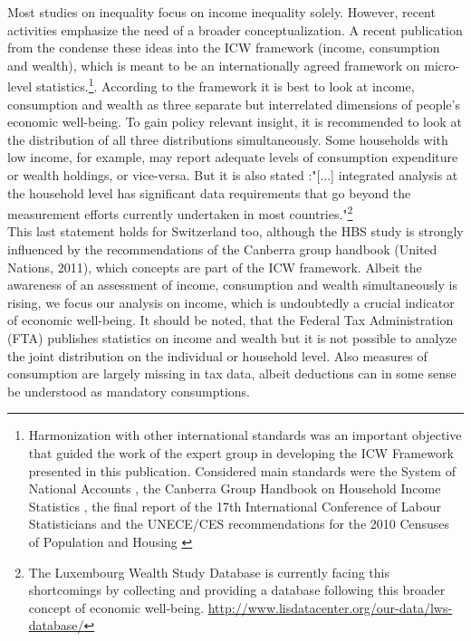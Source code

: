 \documentclass[twoside]{article}\usepackage[]{graphicx}\usepackage[]{color}
\begin{document}
\begin{multicols}{2}
Most studies on inequality focus on income inequality solely. However, recent activities emphasize the need of a broader conceptualization. A recent publication from the \citet{oecd_oecd_2013} condense these ideas into the ICW framework (income, consumption and wealth), which is meant to be an internationally agreed framework on micro-level statistics.\footnote{Harmonization with other international standards was an important objective that guided the work of the expert group in developing the ICW Framework presented in this publication. Considered main standards were the System of National Accounts \citep{sna_system_2008}, the Canberra Group Handbook on Household Income Statistics \citep{united_nations_canberra_2011}, the final report of the 17th International Conference of Labour Statisticians \citep{international_labour_organisation_ilo_final_2004} and the UNECE/CES recommendations for the 2010 Censuses of Population and Housing \citep{unece_conference_2006}}. According to the framework it is best to look at income, consumption and wealth as three separate but interrelated dimensions of people's economic well-being. To gain policy relevant insight, it is recommended to look at the distribution of all three distributions simultaneously. Some households with low income, for example, may report adequate levels of consumption expenditure or wealth holdings, or vice-versa. But it is also stated \citep[18]{oecd_oecd_2013}:"[...] integrated analysis at the household level has significant data requirements that go beyond the measurement efforts currently undertaken in most countries."\footnote{The Luxembourg Wealth Study Database is currently facing this shortcomings by collecting and providing a database following this broader concept of economic well-being. \url{http://www.lisdatacenter.org/our-data/lws-database/}} \\

This last statement holds for Switzerland too, although the HBS study is strongly influenced by the recommendations of the Canberra group handbook (United Nations, 2011), which concepts are part of the ICW framework. Albeit the awareness of an assessment of income, consumption and wealth simultaneously is rising, we focus our analysis on income, which is undoubtedly a crucial indicator of economic well-being. It should be noted, that the Federal Tax Administration (FTA) publishes statistics on income and wealth but it is not possible to analyze the joint distribution on the individual or household level. Also measures of consumption are largely missing in tax data, albeit deductions can in some sense be understood as mandatory consumptions.



\end{multicols}
\end{document}
